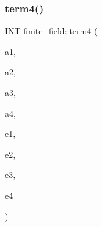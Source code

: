 \subsubsection{\texorpdfstring{term4()}{term4()}}
{\footnotesize\ttfamily \mbox{\hyperlink{galois_8h_a09fddde158a3a20bd2dcadb609de11dc}{I\+NT}} finite\+\_\+field\+::term4 (\begin{DoxyParamCaption}\item[{\mbox{\hyperlink{galois_8h_a09fddde158a3a20bd2dcadb609de11dc}{I\+NT}}}]{a1,  }\item[{\mbox{\hyperlink{galois_8h_a09fddde158a3a20bd2dcadb609de11dc}{I\+NT}}}]{a2,  }\item[{\mbox{\hyperlink{galois_8h_a09fddde158a3a20bd2dcadb609de11dc}{I\+NT}}}]{a3,  }\item[{\mbox{\hyperlink{galois_8h_a09fddde158a3a20bd2dcadb609de11dc}{I\+NT}}}]{a4,  }\item[{\mbox{\hyperlink{galois_8h_a09fddde158a3a20bd2dcadb609de11dc}{I\+NT}}}]{e1,  }\item[{\mbox{\hyperlink{galois_8h_a09fddde158a3a20bd2dcadb609de11dc}{I\+NT}}}]{e2,  }\item[{\mbox{\hyperlink{galois_8h_a09fddde158a3a20bd2dcadb609de11dc}{I\+NT}}}]{e3,  }\item[{\mbox{\hyperlink{galois_8h_a09fddde158a3a20bd2dcadb609de11dc}{I\+NT}}}]{e4 }\end{DoxyParamCaption})}

\mbox{\label{classfinite__field_a3c602cc5a70cf81918e47f1933663c94}} 
